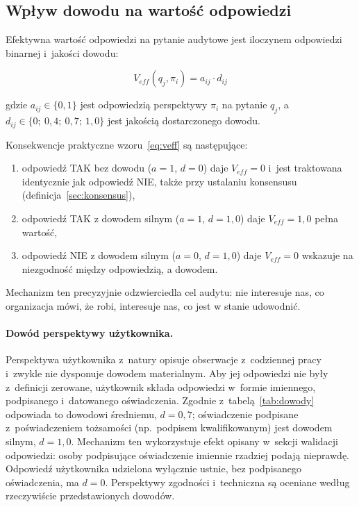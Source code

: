 \subsection{Wpływ dowodu na wartość odpowiedzi}
\label{sec:wplyw-dowodu}

Efektywna wartość odpowiedzi na pytanie audytowe
jest iloczynem odpowiedzi binarnej i~jakości dowodu:

\begin{equation}
V_{eff}(q_j, \pi_i) = a_{ij} \cdot d_{ij}
\label{eq:veff}
\end{equation}

\noindent gdzie $a_{ij} \in \{0, 1\}$ jest odpowiedzią
perspektywy $\pi_i$ na pytanie $q_j$, a
$d_{ij} \in \{0;\ 0{,}4;\ 0{,}7;\ 1{,}0\}$
jest jakością dostarczonego dowodu.

Konsekwencje praktyczne wzoru~\eqref{eq:veff}
są następujące:
\begin{enumerate}[label=(\roman*)]
  \item odpowiedź TAK bez dowodu ($a=1$, $d=0$)
  daje $V_{eff} = 0$ i~jest traktowana identycznie jak odpowiedź NIE,
  także przy ustalaniu konsensusu (definicja~\ref{sec:konsensus}),
  \item odpowiedź TAK z dowodem silnym ($a=1$, $d=1{,}0$)
  daje $V_{eff} = 1{,}0$  pełna wartość,
  \item odpowiedź NIE z dowodem silnym ($a=0$, $d=1{,}0$) daje $V_{eff} = 0$ wskazuje na niezgodność między odpowiedzią, a dowodem.
\end{enumerate}

Mechanizm ten precyzyjnie odzwierciedla cel audytu: nie interesuje nas, co organizacja mówi, że robi, interesuje nas, co jest w stanie udowodnić.

\paragraph{Dowód perspektywy użytkownika.}
Perspektywa użytkownika z~natury opisuje obserwacje z~codziennej pracy i~zwykle nie dysponuje dowodem materialnym. Aby jej odpowiedzi nie były z~definicji zerowane, użytkownik składa odpowiedzi w~formie imiennego, podpisanego i~datowanego oświadczenia. Zgodnie z~tabelą~\ref{tab:dowody} odpowiada to dowodowi średniemu, $d = 0{,}7$; oświadczenie podpisane z~poświadczeniem tożsamości (np.\ podpisem kwalifikowanym) jest dowodem silnym, $d = 1{,}0$. Mechanizm ten wykorzystuje efekt opisany w~sekcji walidacji odpowiedzi: osoby podpisujące oświadczenie imiennie rzadziej podają nieprawdę. Odpowiedź użytkownika udzielona wyłącznie ustnie, bez podpisanego oświadczenia, ma $d = 0$. Perspektywy zgodności i~techniczna są oceniane według rzeczywiście przedstawionych dowodów.



